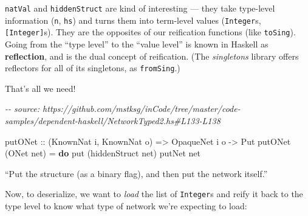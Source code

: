 \documentclass[]{article}
\newenvironment{Shaded}{}{}
\newcommand{\CommentTok}[1]{\textcolor[rgb]{0.38,0.63,0.69}{\textit{#1}}}
\newcommand{\DataTypeTok}[1]{\textcolor[rgb]{0.56,0.13,0.00}{#1}}
\newcommand{\KeywordTok}[1]{\textcolor[rgb]{0.00,0.44,0.13}{\textbf{#1}}}
\newcommand{\NormalTok}[1]{#1}
\newcommand{\OperatorTok}[1]{\textcolor[rgb]{0.40,0.40,0.40}{#1}}
\newcommand{\OtherTok}[1]{\textcolor[rgb]{0.00,0.44,0.13}{#1}}
\begin{document}
\texttt{natVal} and \texttt{hiddenStruct} are kind of interesting --- they take
type-level information (\texttt{n}, \texttt{hs}) and turns them into term-level
values (\texttt{Integer}s, \texttt{{[}Integer{]}}s). They are the opposites of
our reification functions (like \texttt{toSing}). Going from the ``type level''
to the ``value level'' is known in Haskell as \textbf{reflection}, and is the
dual concept of reification. (The \emph{singletons} library offers reflectors
for all of its singletons, as \texttt{fromSing}.)

That's all we need!

\begin{Shaded}
\begin{Highlighting}[]
\CommentTok{{-}{-} source: https://github.com/mstksg/inCode/tree/master/code{-}samples/dependent{-}haskell/NetworkTyped2.hs\#L133{-}L138}

\OtherTok{putONet ::}\NormalTok{ (}\DataTypeTok{KnownNat}\NormalTok{ i, }\DataTypeTok{KnownNat}\NormalTok{ o)}
        \OtherTok{=\textgreater{}} \DataTypeTok{OpaqueNet}\NormalTok{ i o}
        \OtherTok{{-}\textgreater{}} \DataTypeTok{Put}
\NormalTok{putONet (}\DataTypeTok{ONet}\NormalTok{ net) }\OtherTok{=} \KeywordTok{do}
\NormalTok{    put (hiddenStruct net)}
\NormalTok{    putNet net}
\end{Highlighting}
\end{Shaded}

``Put the structure (as a binary flag), and then put the network itself.''

Now, to deserialize, we want to \emph{load} the list of \texttt{Integer}s and
reify it back to the type level to know what type of network we're expecting to
load:

\begin{Shaded}
\end{Shaded}
\end{document}
